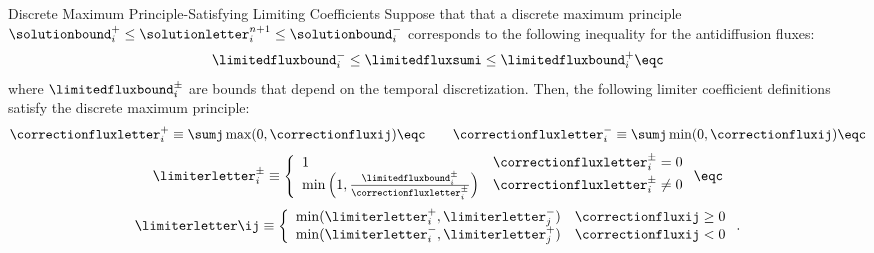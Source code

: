 \begin{theorem}{Discrete Maximum Principle-Satisfying Limiting Coefficients}
   Suppose that that a discrete maximum principle
   $\solutionbound_i^+\le \solutionletter_i^{n+1}\le \solutionbound_i^-$
   corresponds to the following inequality for the antidiffusion fluxes:
   \begin{equation}
      \limitedfluxbound_i^- \le \limitedfluxsumi \le \limitedfluxbound_i^+ \eqc
   \end{equation}
   where $\limitedfluxbound_i^\pm$ are bounds that depend on the temporal
   discretization. Then,
   the following limiter coefficient definitions satisfy the discrete maximum
   principle:
   \begin{equation}\label{eq:flux_sums}
      \correctionfluxletter_i^+ \equiv \sumj\max(0,\correctionfluxij) \eqc\qquad
      \correctionfluxletter_i^- \equiv \sumj\min(0,\correctionfluxij) \eqc
   \end{equation}
   \begin{equation}\label{eq:single_node_limiting_coefficients}
      \limiterletter_i^\pm \equiv\left\{
         \begin{array}{l l}
            1 & \correctionfluxletter_i^\pm = 0\\
            \min\left(1,\frac{\limitedfluxbound_i^\pm}
              {\correctionfluxletter_i^\pm}\right) & \correctionfluxletter_i^\pm
              \ne 0
         \end{array}
         \right. \eqc
   \end{equation}
   \begin{equation}\label{eq:limiting_coefficients}
      \limiterletter\ij \equiv\left\{
         \begin{array}{l l}
            \min(\limiterletter_i^+,\limiterletter_j^-)
              & \correctionfluxij \geq 0\\
            \min(\limiterletter_i^-,\limiterletter_j^+)
              & \correctionfluxij < 0
         \end{array}
         \right..
   \end{equation}  
\end{theorem}

